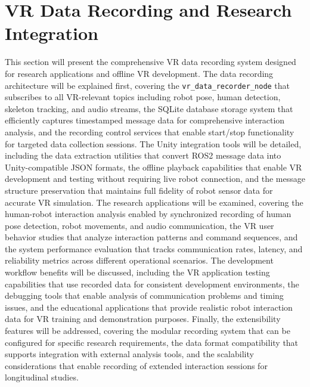 \section{VR Data Recording and Research Integration}
This section will present the comprehensive VR data recording system designed for research applications and offline VR development. The data recording architecture will be explained first, covering the \texttt{vr\_data\_recorder\_node} that subscribes to all VR-relevant topics including robot pose, human detection, skeleton tracking, and audio streams, the SQLite database storage system that efficiently captures timestamped message data for comprehensive interaction analysis, and the recording control services that enable start\slash{}stop functionality for targeted data collection sessions. The Unity integration tools will be detailed, including the data extraction utilities that convert ROS2 message data into Unity-compatible JSON formats, the offline playback capabilities that enable VR development and testing without requiring live robot connection, and the message structure preservation that maintains full fidelity of robot sensor data for accurate VR simulation. The research applications will be examined, covering the human-robot interaction analysis enabled by synchronized recording of human pose detection, robot movements, and audio communication, the VR user behavior studies that analyze interaction patterns and command sequences, and the system performance evaluation that tracks communication rates, latency, and reliability metrics across different operational scenarios. The development workflow benefits will be discussed, including the VR application testing capabilities that use recorded data for consistent development environments, the debugging tools that enable analysis of communication problems and timing issues, and the educational applications that provide realistic robot interaction data for VR training and demonstration purposes. Finally, the extensibility features will be addressed, covering the modular recording system that can be configured for specific research requirements, the data format compatibility that supports integration with external analysis tools, and the scalability considerations that enable recording of extended interaction sessions for longitudinal studies.

